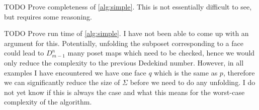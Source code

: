 \documentclass{llncs}
\newcommand{\todo}[1]{
  \begin{tcolorbox}
    TODO {#1} 
  \end{tcolorbox}
}
\begin{document}



\todo{Prove completeness of \autoref{alg:simple}. This is not essentially difficult to
  see, but requires some reasoning.}

\todo{Prove run time of \autoref{alg:simple}. I have not been able to come up
  with an argument for this. Potentially, unfolding the subposet corresponding
  to a face could lead to $D_{m-1}^n$ many poset maps which need to be checked,
  hence we would only reduce the complexity to the previous Dedekind number.
  However, in all examples I have encountered we have one face $q$ which is the
  same as $p$, therefore we can significantly reduce the size of $\Sigma$ before
we need to do any unfolding. I do not yet know if this is always the case and
what this means for the worst-case complexity of the algorithm. }
\end{document}
